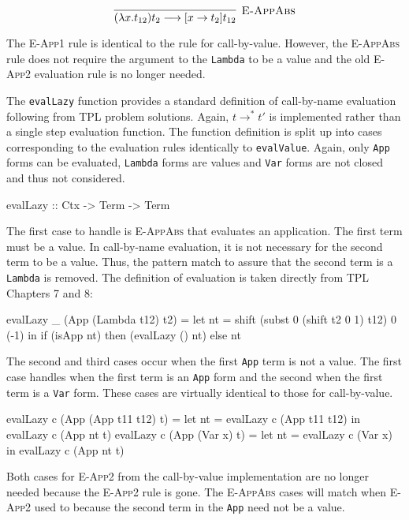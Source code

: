 \documentclass[10pt]{article}
\begin{document}
\[\vcenter{\infer[\textsc{E-AppAbs}]
  {(\lambda x.t_{12})t_2 \longrightarrow [x\rightarrow t_2]t_{12}}{}}\]

The \textsc{E-App1} rule is identical to the rule for call-by-value.
However, the \textsc{E-AppAbs} rule does not require the argument to
the \texttt{Lambda} to be a value and the old \textsc{E-App2}
evaluation rule is no longer needed.

The \texttt{evalLazy} function provides a standard definition of
call-by-name evaluation following from TPL problem solutions.  Again,
$t\longrightarrow^*t'$ is implemented rather than a single step
evaluation function.  The function definition is split up into cases
corresponding to the evaluation rules identically to
\texttt{evalValue}.  Again, only \texttt{App} forms can be evaluated,
\texttt{Lambda} forms are values and \texttt{Var} forms are not closed
and thus not considered.

\begin{code}
  evalLazy :: Ctx -> Term -> Term
\end{code}

The first case to handle is \textsc{E-AppAbs} that evaluates an
application.  The first term must be a value.  In call-by-name
evaluation, it is not necessary for the second term to be a value.
Thus, the pattern match to assure that the second term is a
\texttt{Lambda} is removed.  The definition of evaluation is taken
directly from TPL Chapters 7 and 8:

\begin{code}
  evalLazy _ (App (Lambda t12) t2) =
     let nt = shift (subst 0 (shift t2 0 1) t12) 0 (-1) in
         if (isApp nt) then (evalLazy () nt) else nt
\end{code}

The second and third cases occur when the first \texttt{App} term is
not a value.  The first case handles when the first term is an
\texttt{App} form and the second when the first term is a \texttt{Var}
form.  These cases are virtually identical to those for call-by-value.

\begin{code}
  evalLazy c (App (App t11 t12) t) =
      let nt = evalLazy c (App t11 t12) in evalLazy c (App nt t)
  evalLazy c (App (Var x) t) = 
      let nt = evalLazy c (Var x) in evalLazy c (App nt t)
\end{code}

Both cases for \textsc{E-App2} from the call-by-value implementation
are no longer needed because the \textsc{E-App2} rule is gone.  The
\textsc{E-AppAbs} cases will match when \textsc{E-App2} used to
because the second term in the \texttt{App} need not be a value.
\end{document}
